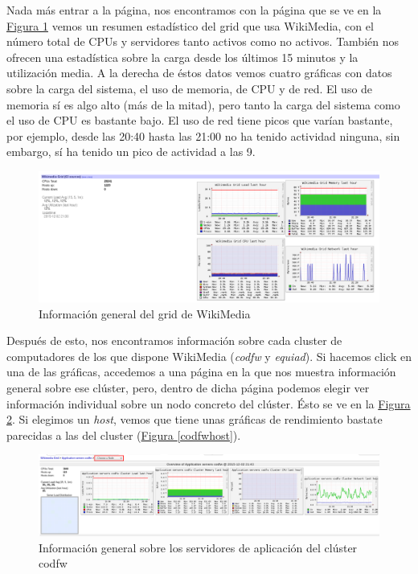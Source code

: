 \documentclass[10pt,a4paper,spanish]{article}
\numberwithin{equation}{section} %
\numberwithin{figure}{section} %
\numberwithin{table}{section} %
\begin{document}
Nada más entrar a la página, nos encontramos con la página que se ve en la \hyperref[wikimediainfo]{Figura \ref*{wikimediainfo}} vemos un resumen estadístico del grid que usa WikiMedia, con el número total de CPUs y servidores tanto activos como no activos. También nos ofrecen una estadística sobre la carga desde los últimos 15 minutos y la utilización media. A la derecha de éstos datos vemos cuatro gráficas con datos sobre la carga del sistema, el uso de memoria, de CPU y de red. El uso de memoria sí es algo alto (más de la mitad), pero tanto la carga del sistema como el uso de CPU es bastante bajo. El uso de red tiene picos que varían bastante, por ejemplo, desde las 20:40 hasta las 21:00 no ha tenido actividad ninguna, sin embargo, sí ha tenido un pico de actividad a las 9.

\begin{figure}[!h]
    \centering
    \includegraphics[width=1\textwidth]{50}
    \caption{Información general del grid de WikiMedia}
    \label{wikimediainfo}
\end{figure}

Después de esto, nos encontramos información sobre cada cluster de computadores de los que dispone WikiMedia (\textit{codfw} y \textit{equiad}). Si hacemos click en una de las gráficas, accedemos a una página en la que nos muestra información general sobre ese clúster, pero, dentro de dicha página podemos elegir ver información individual sobre un nodo concreto del clúster. Ésto se ve en la \hyperref[codfw]{Figura \ref*{codfw}}. Si elegimos un \textit{host}, vemos que tiene unas gráficas de rendimiento bastate parecidas a las del cluster (\hyperref[codfwhost]{Figura \ref*{codfwhost}}).

\begin{figure}[!h]
    \centering
    \includegraphics[width=1\textwidth]{51}
    \caption{Información general sobre los servidores de aplicación del clúster codfw}
    \label{codfw}
\end{figure}
\end{document}
